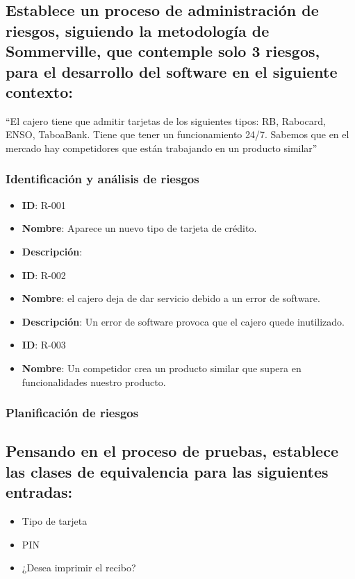 \subsection{Establece un proceso de administración de riesgos, siguiendo la metodología de Sommerville, que contemple solo 3 riesgos, para el desarrollo del software en el siguiente contexto:}
``El cajero tiene que admitir tarjetas de los siguientes tipos: RB, Rabocard, ENSO, TaboaBank. Tiene que tener un funcionamiento 24/7. Sabemos que en el mercado hay competidores que están trabajando en un producto similar''

\subsubsection{Identificación y análisis de riesgos}
\begin{itemize}
    \item \textbf{ID}: R-001
    \item \textbf{Nombre}: Aparece un nuevo tipo de tarjeta de crédito.
    \item \textbf{Descripción}:
\end{itemize}

\begin{itemize}
    \item \textbf{ID}: R-002
    \item \textbf{Nombre}: el cajero deja de dar servicio debido a un error de software.
    \item \textbf{Descripción}: Un error de software provoca que el cajero quede inutilizado.
\end{itemize}

\begin{itemize}
    \item \textbf{ID}: R-003
    \item \textbf{Nombre}: Un competidor crea un producto similar que supera en funcionalidades nuestro producto.
\end{itemize}

\subsubsection{Planificación de riesgos}


\subsection{Pensando en el proceso de pruebas, establece las clases de equivalencia para las siguientes entradas:}
\begin{itemize}
    \item Tipo de tarjeta
    \item PIN
    \item ¿Desea imprimir el recibo?
\end{itemize}